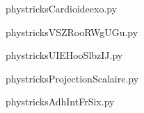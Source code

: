     

    \clearpage
    


    \newcommand{\CaptionFigCardioideexo}{<+Type your caption here+>}
    \begin{center}
        
    \end{center}
    phystricksCardioideexo.py

    

    \clearpage
    


    \newcommand{\CaptionFigVSZRooRWgUGu}{<+Type your caption here+>}
    \begin{center}
        
    \end{center}
    phystricksVSZRooRWgUGu.py

    

    \clearpage
    


    \newcommand{\CaptionFigUIEHooSlbzIJ}{<+Type your caption here+>}
    \begin{center}
        
    \end{center}
    phystricksUIEHooSlbzIJ.py

    

    \clearpage
    


    \newcommand{\CaptionFigProjectionScalaire}{<+Type your caption here+>}
    \begin{center}
        
    \end{center}
    phystricksProjectionScalaire.py

    

    \clearpage
    


    \newcommand{\CaptionFigAdhIntFrSix}{<+Type your caption here+>}
    \begin{center}
        
    \end{center}
    phystricksAdhIntFrSix.py

    

    \clearpage
    

